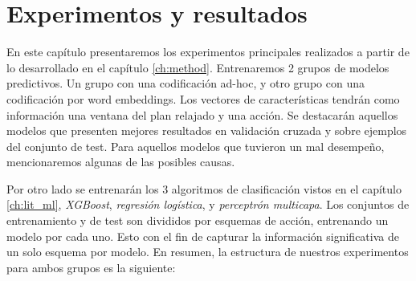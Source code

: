 \chapter{Experimentos y resultados}
\label{ch:results}

En este capítulo presentaremos los experimentos principales realizados a partir
de lo desarrollado en el capítulo \ref{ch:method}. Entrenaremos 2 grupos de
modelos predictivos. Un grupo con una codificación ad-hoc, y otro grupo con una
codificación por word embeddings. Los vectores de características tendrán como
información una ventana del plan relajado y una acción. Se destacarán aquellos
modelos que presenten mejores resultados en validación cruzada y sobre ejemplos
del conjunto de test. Para aquellos modelos que tuvieron un mal desempeño,
mencionaremos algunas de las posibles causas.

Por otro lado se entrenarán los 3 algoritmos de clasificación vistos en el
capítulo \ref{ch:lit_ml}, \emph{XGBoost}, \emph{regresión logística}, y
\emph{perceptrón multicapa}. Los conjuntos de entrenamiento y de test son
divididos por esquemas de acción, entrenando un modelo por cada uno. Esto con el
fin de capturar la información significativa de un solo esquema por modelo. En
resumen, la estructura de nuestros experimentos para ambos grupos es la
siguiente:


